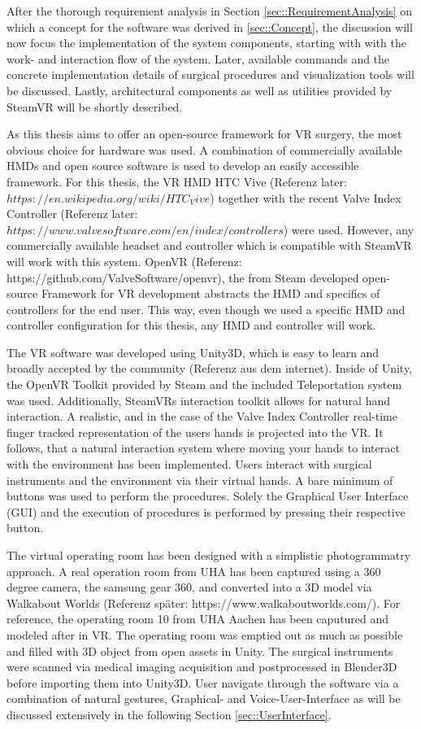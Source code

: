After the thorough requirement analysis in Section \ref{sec::RequirementAnalysis} on which a concept for the software was derived in \ref{sec::Concept}, 
the discussion will now focus the implementation of the system components, starting with with the work- and interaction flow of the system.
Later, available commands and the concrete implementation details of surgical procedures and visualization tools will be discussed.
Lastly, architectural components as well as utilities provided by SteamVR will be shortly described.

As this thesis aims to offer an open-source framework for VR surgery, the most obvious choice for hardware was used.
A combination of commercially available HMDs and open source software is used to develop an easily accessible framework.
For this thesis, the VR HMD HTC Vive (Referenz later: $https://en.wikipedia.org/wiki/HTC_Vive$) together with the recent Valve Index Controller (Referenz later: $https://www.valvesoftware.com/en/index/controllers$) were used.
However, any commercially available headset and controller which is compatible with SteamVR will work with this system.
OpenVR (Referenz: https://github.com/ValveSoftware/openvr), the from Steam developed open-source Framework for VR development abstracts the HMD and specifics of controllers for the end user.
This way, even though we used a specific HMD and controller configuration for this thesis, any HMD and controller will work.

The VR software was developed using Unity3D, which is easy to learn and broadly accepted by the community (Referenz aus dem internet).
Inside of Unity, the OpenVR Toolkit provided by Steam and the included Teleportation system was used.
Additionally, SteamVRs interaction toolkit allows for natural hand interaction.
A realistic, and in the case of the Valve Index Controller real-time finger tracked representation of the users hands is projected into the VR.
It follows, that a natural interaction system where moving your hands to interact with the environment has been implemented.
Users interact with surgical instruments and the environment via their virtual hands.
A bare minimum of buttons was used to perform the procedures.
Solely the Graphical User Interface (GUI) and the execution of procedures is performed by pressing their respective button.

The virtual operating room has been designed with a simplistic photogrammatry approach.
A real operation room from UHA has been captured using a 360 degree camera, the samsung gear 360, and converted into a 3D model via Walkabout Worlds (Referenz später: https://www.walkaboutworlds.com/).
For reference, the operating room 10 from UHA Aachen has been caputured and modeled after in VR.
The operating room was emptied out as much as possible and filled with 3D object from open assets in Unity.
The surgical instruments were scanned via medical imaging acquisition and postprocessed in Blender3D before importing them into Unity3D.
User navigate through the software via a combination of natural gestures, Graphical- and Voice-User-Interface as will be discussed extensively in the following Section \ref{sec::UserInterface}.

